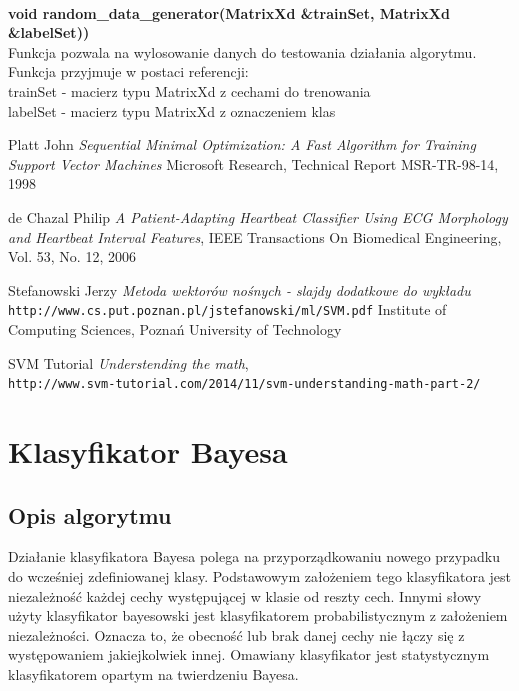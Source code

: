 \documentclass[[10pt,a4paper]{article}
\begin{document}
\newline
\newline
\newline
{}\\
\newline
\textbf {void random\_data\_generator(MatrixXd \&trainSet, MatrixXd \&labelSet))}\\
\newline
\vspace{3mm}Funkcja pozwala na wylosowanie danych do testowania działania algorytmu.\\
\vspace{3mm}Funkcja przyjmuje w postaci referencji:\\
trainSet - macierz typu MatrixXd z cechami do trenowania\\
labelSet - macierz typu MatrixXd z oznaczeniem klas\\
\begin{thebibliography}{9}

Platt John
\textit{Sequential Minimal Optimization: A Fast Algorithm for Training Support Vector Machines} 
Microsoft Research, Technical Report MSR-TR-98-14, 1998

de Chazal Philip 
\textit{A Patient-Adapting Heartbeat Classifier Using ECG Morphology and Heartbeat Interval Features},
IEEE Transactions On Biomedical Engineering, Vol. 53, No. 12, 2006

Stefanowski Jerzy
\textit{Metoda wektorów nośnych - slajdy dodatkowe do wykładu} 
\\\texttt{http://www.cs.put.poznan.pl/jstefanowski/ml/SVM.pdf}
Institute of Computing Sciences, Poznań University of Technology


SVM Tutorial
\textit{Understending the math}, 
\\\texttt{http://www.svm-tutorial.com/2014/11/svm-understanding-math-part-2/}

\end{thebibliography}
\newpage
\section{Klasyfikator Bayesa}
\subsection{Opis algorytmu}
Działanie klasyfikatora Bayesa polega na przyporządkowaniu nowego przypadku do wcześniej zdefiniowanej klasy.  Podstawowym założeniem tego klasyfikatora jest niezależność każdej cechy występującej w klasie od reszty cech. Innymi słowy użyty klasyfikator bayesowski jest klasyfikatorem probabilistycznym z założeniem niezależności. Oznacza to, że obecność lub brak danej cechy nie łączy się z występowaniem jakiejkolwiek innej. Omawiany klasyfikator jest statystycznym klasyfikatorem opartym na twierdzeniu Bayesa.
\end{document}
